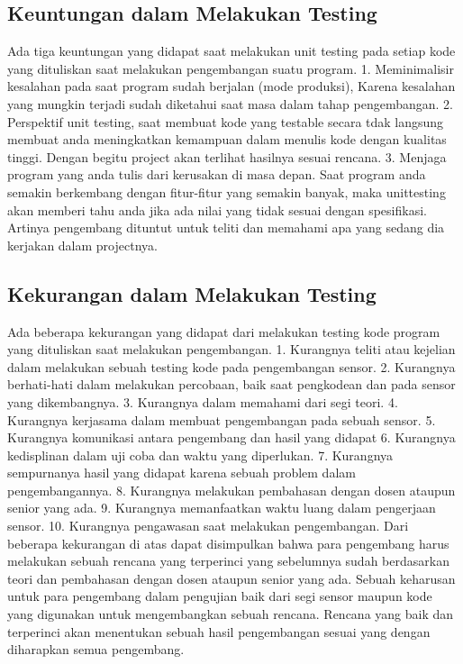 \subsection {Keuntungan dalam Melakukan Testing}
Ada tiga keuntungan yang didapat saat melakukan unit testing pada setiap kode yang dituliskan saat melakukan pengembangan suatu program.
1.	Meminimalisir kesalahan pada saat program sudah berjalan (mode produksi), Karena kesalahan yang mungkin terjadi sudah diketahui saat masa dalam tahap pengembangan.
2.	Perspektif unit testing, saat membuat kode yang testable secara tdak langsung membuat anda meningkatkan kemampuan dalam menulis kode dengan kualitas tinggi. Dengan begitu project akan terlihat hasilnya sesuai rencana.
3.	Menjaga program yang anda tulis dari kerusakan di masa depan. Saat program anda semakin berkembang dengan fitur-fitur yang semakin banyak, maka unittesting akan memberi tahu anda jika ada nilai yang tidak sesuai dengan spesifikasi. Artinya pengembang dituntut untuk teliti dan memahami apa yang sedang dia kerjakan dalam projectnya.

\subsection {Kekurangan dalam Melakukan Testing}
Ada beberapa kekurangan yang didapat dari melakukan testing kode program yang dituliskan saat melakukan pengembangan.
1.	Kurangnya teliti atau kejelian dalam melakukan sebuah testing kode pada pengembangan sensor.
2.	Kurangnya berhati-hati dalam melakukan percobaan, baik saat pengkodean dan pada sensor yang dikembangnya.
3.	Kurangnya dalam memahami dari segi teori.
4.	Kurangnya kerjasama dalam membuat pengembangan pada sebuah sensor.
5.	Kurangnya komunikasi antara pengembang dan hasil yang didapat
6.	Kurangnya kedisplinan dalam uji coba dan waktu yang diperlukan.
7.	Kurangnya sempurnanya hasil yang didapat karena sebuah problem dalam pengembangannya.
8.	Kurangnya melakukan pembahasan dengan dosen ataupun senior yang ada.
9.	Kurangnya memanfaatkan waktu luang dalam pengerjaan sensor.
10.	Kurangnya pengawasan saat melakukan pengembangan.
Dari beberapa kekurangan di atas dapat disimpulkan bahwa para pengembang harus melakukan sebuah rencana yang terperinci yang sebelumnya sudah berdasarkan teori dan pembahasan dengan dosen ataupun senior yang ada. Sebuah keharusan untuk para pengembang dalam pengujian baik dari segi sensor maupun kode yang digunakan untuk mengembangkan sebuah rencana.
Rencana yang baik dan terperinci akan menentukan sebuah hasil pengembangan sesuai yang dengan diharapkan semua pengembang.

